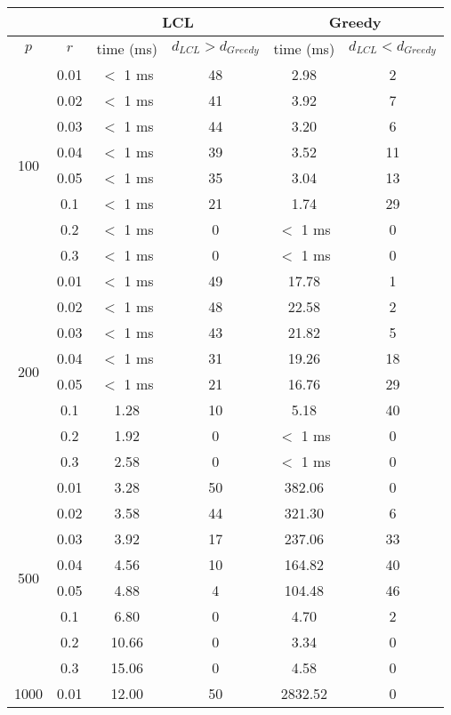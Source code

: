 \begin{tabular}{| c | c | c | c | c | c | }
	\hline
	& & \multicolumn{2}{c|}{LCL} & \multicolumn{2}{c|}{Greedy}\\
	\hline
	$p$ & $r$ & time (ms) & $d_{LCL} > d_{Greedy}$ & time (ms) &  $d_{LCL} < d_{Greedy}$ \\
	\hline
	\multirow{8}{*}{100} & 0.01 & $<$ 1 ms & 48 & 2.98 & 2\\
	\cline{2-6}
	& 0.02 & $<$ 1 ms & 41 & 3.92 & 7\\
	\cline{2-6}
	& 0.03 & $<$ 1 ms & 44 & 3.20 & 6\\
	\cline{2-6}
	& 0.04 & $<$ 1 ms & 39 & 3.52 & 11\\
	\cline{2-6}
	& 0.05 & $<$ 1 ms & 35 & 3.04 & 13\\
	\cline{2-6}
	& 0.1 & $<$ 1 ms & 21 & 1.74 & 29\\
	\cline{2-6}
	& 0.2 & $<$ 1 ms & 0 & $<$ 1 ms & 0\\
	\cline{2-6}
	& 0.3 & $<$ 1 ms & 0 & $<$ 1 ms & 0\\
	\hline
	\multirow{8}{*}{200} & 0.01 & $<$ 1 ms & 49 & 17.78 & 1\\
	\cline{2-6}
	& 0.02 & $<$ 1 ms & 48 & 22.58 & 2\\
	\cline{2-6}
	& 0.03 & $<$ 1 ms & 43 & 21.82 & 5\\
	\cline{2-6}
	& 0.04 & $<$ 1 ms & 31 & 19.26 & 18\\
	\cline{2-6}
	& 0.05 & $<$ 1 ms & 21 & 16.76 & 29\\
	\cline{2-6}
	& 0.1 & 1.28 & 10 & 5.18 & 40\\
	\cline{2-6}
	& 0.2 & 1.92 & 0 & $<$ 1 ms & 0\\
	\cline{2-6}
	& 0.3 & 2.58 & 0 & $<$ 1 ms & 0\\
	\hline
	\multirow{8}{*}{500} & 0.01 & 3.28 & 50 & 382.06 & 0\\
	\cline{2-6}
	& 0.02 & 3.58 & 44 & 321.30 & 6\\
	\cline{2-6}
	& 0.03 & 3.92 & 17 & 237.06 & 33\\
	\cline{2-6}
	& 0.04 & 4.56 & 10 & 164.82 & 40\\
	\cline{2-6}
	& 0.05 & 4.88 & 4 & 104.48 & 46\\
	\cline{2-6}
	& 0.1 & 6.80 & 0 & 4.70 & 2\\
	\cline{2-6}
	& 0.2 & 10.66 & 0 & 3.34 & 0\\
	\cline{2-6}
	& 0.3 & 15.06 & 0 & 4.58 & 0\\
	\hline
	\multirow{8}{*}{1000} & 0.01 & 12.00 & 50 & 2832.52 & 0\\

\end{tabular}
